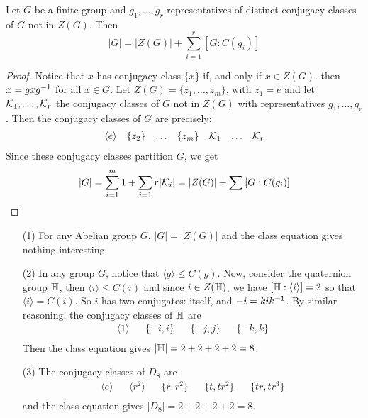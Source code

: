 \begin{theorem}\label{theorem_4.3.2}
  Let $G$ be a finite group and  $g_1, \dots, g_r$ representatives of distinct
  conjugacy classes of $G$ not in  $Z(G)$. Then
  \begin{equation*}
    |G|=|Z(G)|+\sum_{i=1}^r{[G : C(g_i)]}
  \end{equation*}
\end{theorem}
\begin{proof}
  Notice that $x$ has conjugacy class  $\{x\}$ if, and only if $x \in Z(G)$.
  then $x=gxg^{-1}$ for all $x \in G$. Let  $Z(G)=\{z_1, \dots, z_m\}$, with
  $z_1=e$ and let $\mathcal{K}_1, \dots, \mathcal{K}_r$ the conjugacy classes of $G$ not in
  $Z(G)$ with representatives $g_1, \dots, g_r$. Then the conjugacy classes of
  $G$ are precisely:
  \begin{align*}
    \langle e \rangle && \{z_2\} && \dots && \{z_m\} && \mathcal{K}_1 && \dots && \mathcal{K}_r   \\
  \end{align*}
  Since these conjugacy classes partition $G$, we get
  \begin{equation*}
    |G|=\sum_{i=1}^m{1}+\sum_{i=1}{r}{|\mathcal{K}_i|}=|Z(G)|+\sum{[G:C(g_i)]}
  \end{equation*}
\end{proof}

\begin{example}\label{example_4.8}
  \begin{enumerate}
    \item[(1)] For any Abelian group $G$,  $|G|=|Z(G)|$ and the
      class equation gives nothing interesting.

    \item[(2)] In any group $G$, notice that  $\langle g \rangle \leq C(g)$.
      Now, consider the quaternion group $\mathbb{H}$, then
      $\langle i \rangle \leq C(i)$ and since $i \in Z(\mathbb{H})$, we have
      $[\mathbb{H}:\langle i \rangle]=2$ so that $\langle i \rangle=C(i)$. So $i$
      has two conjugates: itself, and  $-i=kik^{-1}$. By similar reasoning,
      the conjugacy classes of $\mathbb{H}$ are
      \begin{align*}
        \langle 1 \rangle && \{-i,i\} && \{-j,j\} && \{-k,k\}   \\
      \end{align*}
      Then the class equation gives $|\mathbb{H}|=2+2+2+2=8$.

    \item[(3)] The conjugacy classes of $D_8$ are
      \begin{align*}
        \langle e \rangle && \langle r^2 \rangle &&\{r,r^2\} &&
        \{t,tr^2\} && \{tr,tr^3\}   \\
      \end{align*}
      and the class equation gives $|D_8|=2+2+2+2=8$.
  \end{enumerate}
\end{example}

